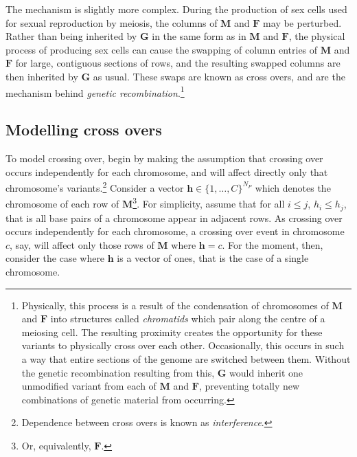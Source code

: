 \documentclass{article}
\newcommand{\ve}[1]{\mathbf{#1}}           %
\newcommand{\m}[1]{\mathbf{#1}}               %
\begin{document}
The mechanism is slightly more complex. During the production of sex cells used for sexual reproduction by meiosis, the columns of $\m{M}$ and $\m{F}$ may be perturbed. Rather than being inherited by $\m{G}$ in the same form as in $\m{M}$ and $\m{F}$, the physical process of producing sex cells can cause the swapping of column entries of $\m{M}$ and $\m{F}$ for large, contiguous sections of rows, and the resulting swapped columns are then inherited by $\m{G}$ as usual. These swaps are known as cross overs, and are the mechanism behind \textit{genetic recombination}.\footnote{Physically, this process is a result of the condensation of chromosomes of $\m{M}$ and $\m{F}$ into structures called \textit{chromatids} which pair along the centre of a meiosing cell. The resulting proximity creates the opportunity for these variants to physically cross over each other. Occasionally, this occurs in such a way that entire sections of the genome are switched between them. Without the genetic recombination resulting from this, $\m{G}$ would inherit one unmodified variant from each of $\m{M}$ and $\m{F}$, preventing totally new combinations of genetic material from occurring.}

\subsection{Modelling cross overs} \label{subsubsec:modelcrossing}

To model crossing over, begin by making the assumption that crossing over occurs independently for each chromosome, and will affect directly only that chromosome's variants.\footnote{Dependence between cross overs is known as \textit{interference}.} Consider a vector $\ve{h} \in \{1, \dots, C\}^{N_P}$ which denotes the chromosome of each row of $\m{M}$\footnote{Or, equivalently, $\m{F}$.}. For simplicity, assume that for all $i \leq j$, $h_i \leq h_j$, that is all base pairs of a chromosome appear in adjacent rows. As crossing over occurs independently for each chromosome, a crossing over event in chromosome $c$, say, will affect only those rows of $\m{M}$ where $\ve{h} = c$. For the moment, then, consider the case where $\ve{h}$ is a vector of ones, that is the case of a single chromosome.
\end{document}
